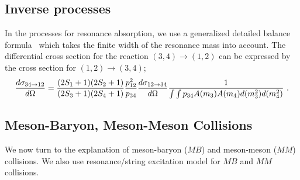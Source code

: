 \documentclass[]{article}
\begin{document}
\subsection{Inverse processes}

In the processes for resonance absorption,
  we use a generalized detailed balance formula~\cite{Wolf2,detbal1,detbal2}
  which takes the finite width of the resonance mass into account.
The differential cross section for the reaction $(3,4)\to(1,2)$
can be expressed by the cross section for $(1,2)\to(3,4)$;
\begin{equation}
  {d\sigma_{34\to 12}\over d\Omega}=
       {(2S_1+1)(2S_2+1)\over (2S_3+1)(2S_4+1)}
          {p^2_{12} \over p_{34}}
    {d\sigma_{12\to 34}\over d\Omega}
     {1\over \int\int p_{34} A(m_3)A(m_4)d(m_3^2)d(m_4^2)}~.
\end{equation}


\subsection{Meson-Baryon, Meson-Meson Collisions}
\label{subsec:MBMM}

We now turn to the explanation of meson-baryon ($MB$) and meson-meson
($MM$) collisions.
We also use
 resonance/string excitation model for $MB$ and $MM$ collisions.
\end{document}
